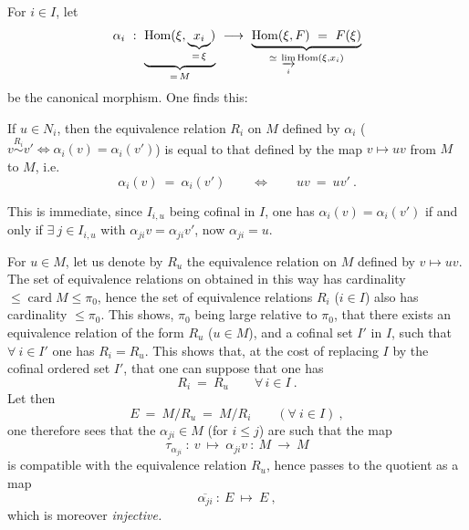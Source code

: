 \documentclass[11pt]{article}
\newcommand{\printedpage}[1]{\marginpar{\footnotesize p.~#1}}
\newcommand{\msp}[1]{\marginpar{\footnotesize [#1]}}
\newcommand{\card}{\operatorname{card}}
\begin{document}
For $i \in I$, let
\[
\alpha_i \ : \ \underbrace{\mathrm{Hom}(\xi, \underbrace{x_i}_{=\,\xi})}_{=\,M} \ \longrightarrow \ \underbrace{\mathrm{Hom}(\xi,F) \ = \ F(\xi)}_{\simeq\ \varinjlim\limits_{i} \mathrm{Hom}(\xi,x_i)}
\]
\printedpage{176}
be the canonical morphism. One finds this:
\begin{center}
%
\begin{minipage}[c]{0.78\linewidth}
If $u \in N_i$, then the equivalence relation $R_i$ on $M$ defined by $\alpha_i$ ($v \overset{R_i}{\sim} v' \Longleftrightarrow \alpha_i(v) = \alpha_i(v')$) is equal to that defined by the map $v \longmapsto uv$ from $M$ to $M$, i.e.
\[
\alpha_i(v) \ = \ \alpha_i(v') \qquad \Longleftrightarrow \qquad uv \ = \ uv' \ .
\]
\end{minipage}
\end{center}

This is immediate, since $I_{i,u}$ being cofinal in $I$, one has $\alpha_i(v) = \alpha_i(v')$ if and only if $\exists\ j \in I_{i,u}$ with $\alpha_{ji}v = \alpha_{ji}v'$, now $\alpha_{ji} = u$. %

For $u \in M$, let us denote by $R_u$ the equivalence relation on $M$ defined by $v \longmapsto uv$. The set of equivalence relations on
\msp{page 455}
obtained in this way has cardinality $\leqslant \card M \leqslant \pi_0$, hence the set of equivalence relations $R_i$ ($i \in I$) also has cardinality $\leqslant \pi_0$. This shows, $\pi_0$ being large relative to $\pi_0$, that there exists an equivalence relation of the form $R_u$ ($u \in M$), and a cofinal set $I'$ in $I$, such that $\forall\ i \in I'$ one has $R_i = R_u$. This shows that, at the cost of replacing $I$ by the cofinal ordered set $I'$, that one can suppose that one has
\[
R_i \ = \ R_u \qquad \forall\, i \in I \ .
\tag*{(4.15.8.5)}
\]
Let then
\[
E \ = \ M/R_u \ = \ M/R_i \qquad (\forall\ i \in I) \ ,
\]
one therefore sees that the $\alpha_{ji} \in M$ (for $i \leqslant j$) are such that the map
\[
\tau_{\alpha_{ji}} \ : \ v \ \longmapsto \ \alpha_{ji}v \ : \ M \ \longrightarrow \ M
\]
is compatible with the equivalence relation $R_u$, hence passes to the quotient as a map
\[
\overline{\alpha_{ji}} \ : \ E \ \longmapsto \ E \ ,
\]
which is moreover \textit{injective.}
\end{document}
